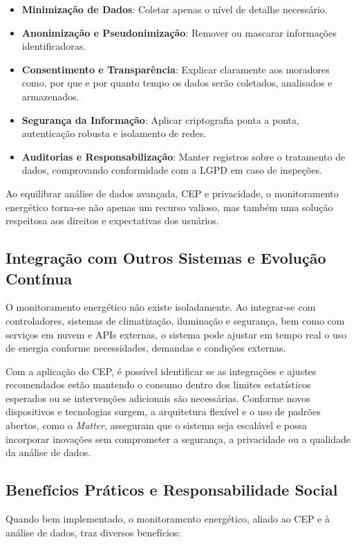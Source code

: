 \begin{itemize}
    \item \textbf{Minimização de Dados}: Coletar apenas o nível de detalhe necessário.  
    \item \textbf{Anonimização e Pseudonimização}: Remover ou mascarar informações identificadoras.
    \item \textbf{Consentimento e Transparência}: Explicar claramente aos moradores como, por que e por quanto tempo os dados serão coletados, analisados e armazenados.
    \item \textbf{Segurança da Informação}: Aplicar criptografia ponta a ponta, autenticação robusta e isolamento de redes.
    \item \textbf{Auditorias e Responsabilização}: Manter registros sobre o tratamento de dados, comprovando conformidade com a LGPD em caso de inspeções.
\end{itemize}

Ao equilibrar análise de dados avançada, CEP e privacidade, o monitoramento energético torna-se não apenas um recurso valioso, mas também uma solução respeitosa aos direitos e expectativas dos usuários.

\subsection{Integração com Outros Sistemas e Evolução Contínua}

O monitoramento energético não existe isoladamente. Ao integrar-se com controladores, sistemas de climatização, iluminação e segurança, bem como com serviços em nuvem e APIs externas, o sistema pode ajustar em tempo real o uso de energia conforme necessidades, demandas e condições externas.

Com a aplicação do CEP, é possível identificar se as integrações e ajustes recomendados estão mantendo o consumo dentro dos limites estatísticos esperados ou se intervenções adicionais são necessárias. Conforme novos dispositivos e tecnologias surgem, a arquitetura flexível e o uso de padrões abertos, como o \textit{Matter}, asseguram que o sistema seja escalável e possa incorporar inovações sem comprometer a segurança, a privacidade ou a qualidade da análise de dados.
\subsection{Benefícios Práticos e Responsabilidade Social}

Quando bem implementado, o monitoramento energético, aliado ao CEP e à análise de dados, traz diversos benefícios:

